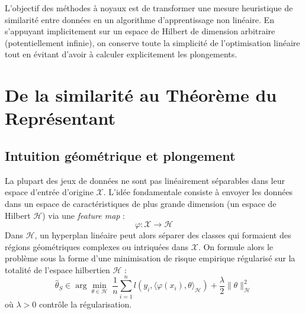 
\minitoc

L'objectif des méthodes à noyaux est de transformer une mesure heuristique de similarité entre données en un algorithme d'apprentissage non linéaire. En s'appuyant implicitement sur un espace de Hilbert de dimension arbitraire (potentiellement infinie), on conserve toute la simplicité de l'optimisation linéaire tout en évitant d'avoir à calculer explicitement les plongements.


\section{De la similarité au Théorème du Représentant}

\subsection{Intuition géométrique et plongement}

La plupart des jeux de données ne sont pas linéairement séparables dans leur espace d'entrée d'origine $\mathcal{X}$. L'idée fondamentale consiste à envoyer les données dans un espace de caractéristiques de plus grande dimension (un espace de Hilbert $\mathcal{H}$) via une \emph{feature map} :
\begin{equation}
    \varphi : \mathcal{X} \longrightarrow \mathcal{H}
\end{equation}
Dans $\mathcal{H}$, un hyperplan linéaire peut alors séparer des classes qui formaient des régions géométriques complexes ou intriquées dans $\mathcal{X}$. 
On formule alors le problème sous la forme d'une minimisation de risque empirique régularisé sur la totalité de l'espace hilbertien $\mathcal{H}$ :
\begin{equation}
    \hat{\theta}_S \in \arg\min_{\theta \in \mathcal{H}} \; \frac{1}{n} \sum_{i=1}^n l\left(y_i, \langle \varphi(x_i), \theta \rangle_{\mathcal{H}}\right) + \frac{\lambda}{2} \|\theta\|_{\mathcal{H}}^2 \label{eq:initial-problem}
\end{equation}
où $\lambda > 0$ contrôle la régularisation. 


